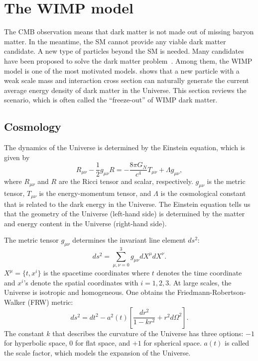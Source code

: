 \documentclass[doublespace,nopageskip]{VTthesis}
\begin{document}
\section{The WIMP model}\label{se:wimp}

The CMB observation means that dark matter is not made out of missing baryon matter. In the meantime, the SM cannot provide any viable dark matter candidate. A new type of particles beyond the SM is needed.  Many candidates have been proposed to solve the dark matter problem~\cite{2005PhR...405..279B}. Among them, the WIMP model is one of the most motivated models. \citet{1979ARNPS..29..313S} shows that a new particle with a weak scale mass and interaction cross section can naturally generate the current average energy density of dark matter in the Universe. This section reviews the scenario, which is often called the ``freeze-out'' of WIMP dark matter.

\subsection{{Cosmology}}

The dynamics of the Universe is determined by the Einstein equation, which is given by
\begin{equation}
    R_{\mu\nu} - \frac{1}{2}g_{\mu\nu}R = -\frac{8\pi G_N}{c^4}T_{\mu\nu} + \Lambda g_{\mu\nu},
\end{equation}
where $R_{\mu\nu}$ and $R$ are the Ricci tensor and scalar, respectively. $g_{\mu\nu}$ is the metric tensor, $T_{\mu\nu}$ is the energy-momentum tensor, and $\Lambda$ is the cosmological constant that is related to the dark energy in the Universe. The Einstein equation tells us that the geometry of the Universe (left-hand side) is determined by the matter and energy content in the Universe (right-hand side).

The metric tensor $g_{\mu\nu}$ determines the invariant line element $ds^2$:
\begin{equation}
    ds^2 = \sum_{\mu,\nu=0}^{3}g_{\mu\nu}dX^{\mu}dX^{\nu}.
\end{equation}
$X^\mu = \{t, x^i\}$ is the spacetime coordinates where $t$ denotes the time coordinate and $x^i$'s denote the spatial coordinates with $i = 1, 2, 3$. At large scales, the Universe is isotropic and homogeneous. One obtains the Friedmann-Robertson-Walker (FRW) metric:
\begin{equation}
    ds^2 = dt^2 - a^2(t)\left[\frac{dr^2}{1-kr^2}+r^2d\Omega^2\right].
\end{equation}
The constant $k$ that describes the curvature of the Universe has three options: $-1$ for hyperbolic space, 0 for flat space, and $+1$ for spherical space. $a(t)$ is called the scale factor, which models the expansion of the Universe.
\end{document}
